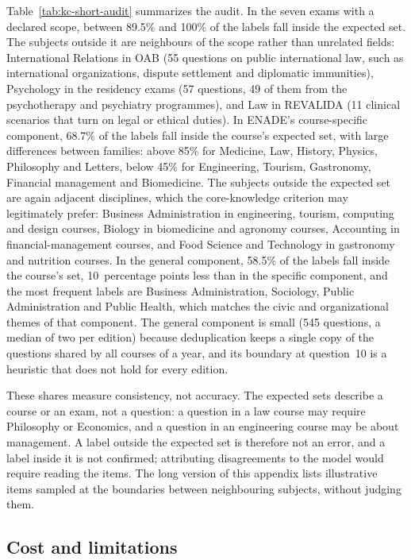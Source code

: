 Table~\ref{tab:kc-short-audit} summarizes the audit. In the seven exams with
a declared scope, between 89.5\% and 100\% of the labels fall inside the
expected set. The subjects outside it are neighbours of the scope rather than
unrelated fields: International Relations in OAB (55 questions on public
international law, such as international organizations, dispute settlement
and diplomatic immunities), Psychology in the residency exams (57 questions,
49 of them from the psychotherapy and psychiatry programmes), and Law in
REVALIDA (11 clinical scenarios that turn on legal or ethical duties). In ENADE's course-specific component, 68.7\% of the labels
fall inside the course's expected set, with large differences between
families: above 85\% for Medicine, Law, History, Physics, Philosophy and
Letters, below 45\% for Engineering, Tourism, Gastronomy, Financial
management and Biomedicine. The subjects outside the expected set are again
adjacent disciplines, which the core-knowledge criterion may legitimately
prefer: Business Administration in engineering, tourism, computing and
design courses, Biology in biomedicine and agronomy courses,
Accounting in financial-management courses, and Food Science and Technology
in gastronomy and nutrition courses. In the general component, 58.5\% of the
labels fall inside the course's set, 10~percentage points less than in the
specific component, and the most frequent labels are Business
Administration, Sociology, Public Administration and Public Health, which
matches the civic and organizational themes of that component. The general
component is small (545 questions, a median of two per edition) because
deduplication keeps a single copy of the questions shared by all courses of a
year, and its boundary at question~10 is a heuristic that does not hold for
every edition.

These shares measure consistency, not accuracy. The expected sets describe
a course or an exam, not a question: a question in a law course may require
Philosophy or Economics, and a question in an engineering course may be
about management. A label outside the expected set is therefore not an
error, and a label inside it is not confirmed; attributing disagreements to
the model would require reading the items. The long version of this appendix
lists illustrative items sampled at the boundaries between neighbouring
subjects, without judging them.

\subsection{Cost and limitations}
\label{app:kc-short-limits}

